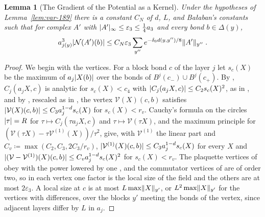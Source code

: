\documentclass[11pt]{preprint}
\DeclarePairedDelimiter{\abs}{\lvert}{\rvert}
\DeclarePairedDelimiter{\norm}{\lVert}{\rVert}
\numberwithin{equation}{section}
\newtheorem{lemma}{Lemma}[section]
\theoremstyle{definition}
\theoremstyle{remark}
\theoremstyle{plain}
\begin{document}
\begin{lemma}[The Gradient of the Potential as a Kernel]\label{lem:var-prop4-kernel}
Under the hypotheses of Lemma~\ref{lem:var-189} there is a constant $C_N$ of $d$, $L$, and Ba{\l}aban's constants such that for complex $A'$ with $\abs{A'}_\infty \leq \varepsilon_3 \leq \frac14a_3$ and every bond $b \in \Delta(y)$,
\begin{equation}\label{eq:var-prop4-kernel}
    a_{j(y)}^3\abs{\mathcal N(A')(b)} \leq C_N\varepsilon_3\sum_{y''}e^{-\delta_0d(y,y'')/8}\norm{A'}_{y''}\;.
\end{equation}
\end{lemma}

\begin{proof}
We begin with the vertices. For a block bond $c$ of the layer $j$ let $s_c(X)$ be the maximum of $a_j\abs{X(b)}$ over the bonds of $B^j(c_-) \cup B^j(c_+)$. By \cite[Proposition~4, p.~38, l.~48--p.~39, l.~10]{BalabanAVG}, $C_j(a_jX, c)$ is analytic for $s_c(X) < c_4$ with $\abs{C_j(a_jX, c)} \leq C_2s_c(X)^2$, as in \cite[(44)]{BalabanVAR}, and by \cite[Proposition~5, (157), p.~42]{BalabanAVG}, rescaled as in \cite[(72)]{BalabanVAR}, the vertex $\mathcal V(X)(c, b)$ satisfies $\abs{\mathcal V(X)(c, b)} \leq C_3a_j^{1-d}s_c(X)$ for $s_c(X) < r_v$. Cauchy's formula on the circles $\abs\tau = R$ for $\tau \mapsto C_j(\tau a_jX, c)$ and $\tau \mapsto \mathcal V(\tau X)$, and the maximum principle for $(\mathcal V(\tau X) - \tau\mathcal V^{(1)}(X))/\tau^2$, give, with $\mathcal V^{(1)}$ the linear part and $C_v \coloneqq \max(C_2, C_3, 2C_3/r_v)$, $\abs{\mathcal V^{(1)}(X)(c, b)} \leq C_3a_j^{1-d}s_c(X)$ for every $X$ and $\abs{(\mathcal V - \mathcal V^{(1)})(X)(c, b)} \leq C_va_j^{1-d}s_c(X)^2$ for $s_c(X) < r_v$. The plaquette vertices of \cite[(90)]{BalabanVAR} obey \cite[(40)]{BalabanVAR} with the power lowered by one \cite[p.~291, ll.~58--59]{BalabanVAR}, and the commutator vertices of \cite[(91)--(96)]{BalabanVAR} are of order two, so in each vertex one factor is the local size of the field and the others are at most $2\varepsilon_3$. A local size at $c$ is at most $L\max\norm X_{y'}$, or $L^2\max\norm X_{y'}$ for the vertices with differences, over the blocks $y'$ meeting the bonds of the vertex, since adjacent layers differ by $L$ in $a_j$.


\end{proof}
\end{document}
